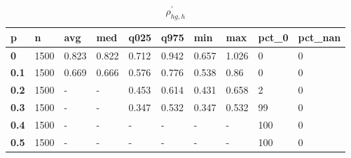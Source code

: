 \begin{table}[h]
 \centering 
\footnotesize
\caption{$\rho_{hg,h}^\prime $}
\label{tab:alphahgh}
\begin{tabular}[h]{|l|l|l|l|l|l|l|l|l|l|
    } \hline
\textbf{ p} & \textbf{ n} & \textbf{ avg} & \textbf{ med} & \textbf{ q025} & \textbf{ q975} & \textbf{ min} & \textbf{ max} & \textbf{ pct\_0} & \textbf{ pct\_nan}
    \\ \hline
  \textbf{  0} & 1500 & 0.823 & 0.822 & 0.712 & 0.942 & 0.657 & 1.026 &   0 & 0
    \\ \hline
  \textbf{0.1} & 1500 & 0.669 & 0.666 & 0.576 & 0.776 & 0.538 &  0.86 &   0 & 0
    \\ \hline
  \textbf{0.2} & 1500 & - & - & 0.453 & 0.614 & 0.431 & 0.658 &   2 & 0
    \\ \hline
  \textbf{0.3} & 1500 & - & - & 0.347 & 0.532 & 0.347 & 0.532 &  99 & 0
    \\ \hline
  \textbf{0.4} & 1500 & - & - & - & - & - & - & 100 & 0
    \\ \hline
  \textbf{0.5} & 1500 & - & - & - & - & - & - & 100 & 0
    \\ \hline
 \end{tabular}
 \end{table}
